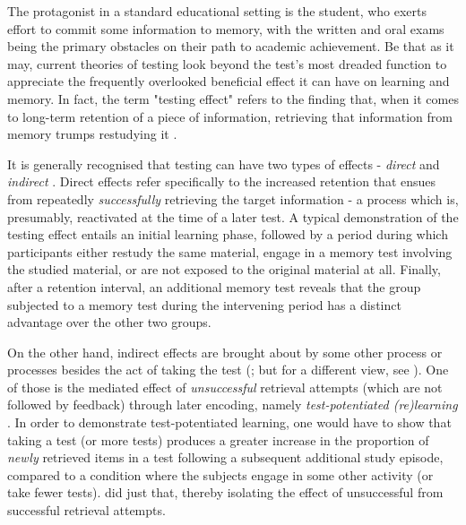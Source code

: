 \documentclass[../main.tex]{subfiles}
\begin{document}
The protagonist in a standard educational setting is the student, who exerts effort to commit some information to memory, with the written and oral exams being the primary obstacles on their path to academic achievement. Be that as it may, current theories of testing look beyond the test's most dreaded function to appreciate the frequently overlooked beneficial effect it can have on learning and memory. In fact, the term "testing effect" refers to the finding that, when it comes to long-term retention of a piece of information, retrieving that information from memory trumps restudying it \citep{roedigeriiiPowerTestingMemory2006, roedigeriiiTestEnhancedLearningTaking2006, rowlandEffectTestingRestudy2014, adesopeRethinkingUseTests2017, roedigeriiiCriticalRoleRetrieval2011, gloverTestingPhenomenonNot1989}. 

It is generally recognised that testing can have two types of effects - \textit{direct} and \textit{indirect} \citep{arnoldTestpotentiatedLearningDistinguishing2013, roedigeriiiPowerTestingMemory2006}. Direct effects refer specifically to the increased retention that ensues from repeatedly \textit{successfully} retrieving the target information - a process which is, presumably, reactivated at the time of a later test. A typical demonstration of the testing effect entails an initial learning phase, followed by a period during which participants either restudy the same material, engage in a memory test involving the studied material, or are not exposed to the original material at all. Finally, after a retention interval, an additional memory test reveals that the group subjected to a memory test during the intervening period has a distinct advantage over the other two groups. 

On the other hand, indirect effects are brought about by some other process or processes besides the act of taking the test (\citealp{roedigeriiiPowerTestingMemory2006}; but for a different view, see \citealp{kornellRetrievalAttemptsEnhance2015}). One of those is the mediated effect of \textit{unsuccessful} retrieval attempts (which are not followed by feedback) through later encoding, namely \textit{test-potentiated (re)learning} \citep{izawaReinforcementTestSequencesPairedAssociate1966,izawaOptimalPotentiatingEffects1970, kornellUnsuccessfulRetrievalAttempts2009, arnoldFreeRecallEnhances2013, arnoldTestpotentiatedLearningDistinguishing2013}. In order to demonstrate test-potentiated learning, one would have to show that taking a test (or more tests) produces a greater increase in the proportion of \textit{newly} retrieved items in a test following a subsequent additional study episode, compared to a condition where the subjects engage in some other activity (or take fewer tests). \cite{arnoldTestpotentiatedLearningDistinguishing2013} did just that, thereby isolating the effect of unsuccessful from successful retrieval attempts.
\end{document}
